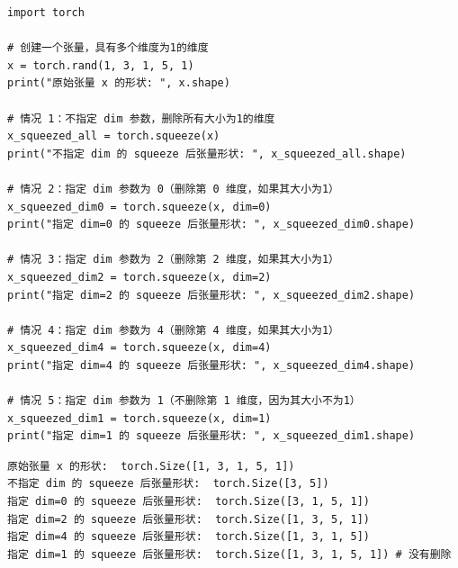 \begin{lstlisting}[style=pythonstyle]
import torch

# 创建一个张量，具有多个维度为1的维度
x = torch.rand(1, 3, 1, 5, 1)
print("原始张量 x 的形状: ", x.shape)

# 情况 1：不指定 dim 参数，删除所有大小为1的维度
x_squeezed_all = torch.squeeze(x)
print("不指定 dim 的 squeeze 后张量形状: ", x_squeezed_all.shape)

# 情况 2：指定 dim 参数为 0（删除第 0 维度，如果其大小为1）
x_squeezed_dim0 = torch.squeeze(x, dim=0)
print("指定 dim=0 的 squeeze 后张量形状: ", x_squeezed_dim0.shape)

# 情况 3：指定 dim 参数为 2（删除第 2 维度，如果其大小为1）
x_squeezed_dim2 = torch.squeeze(x, dim=2)
print("指定 dim=2 的 squeeze 后张量形状: ", x_squeezed_dim2.shape)

# 情况 4：指定 dim 参数为 4（删除第 4 维度，如果其大小为1）
x_squeezed_dim4 = torch.squeeze(x, dim=4)
print("指定 dim=4 的 squeeze 后张量形状: ", x_squeezed_dim4.shape)

# 情况 5：指定 dim 参数为 1（不删除第 1 维度，因为其大小不为1）
x_squeezed_dim1 = torch.squeeze(x, dim=1)
print("指定 dim=1 的 squeeze 后张量形状: ", x_squeezed_dim1.shape)
\end{lstlisting}
\begin{lstlisting}[style=demostyle,numbers=none]
原始张量 x 的形状:  torch.Size([1, 3, 1, 5, 1])
不指定 dim 的 squeeze 后张量形状:  torch.Size([3, 5])
指定 dim=0 的 squeeze 后张量形状:  torch.Size([3, 1, 5, 1])
指定 dim=2 的 squeeze 后张量形状:  torch.Size([1, 3, 5, 1])
指定 dim=4 的 squeeze 后张量形状:  torch.Size([1, 3, 1, 5])
指定 dim=1 的 squeeze 后张量形状:  torch.Size([1, 3, 1, 5, 1]) # 没有删除
\end{lstlisting}

